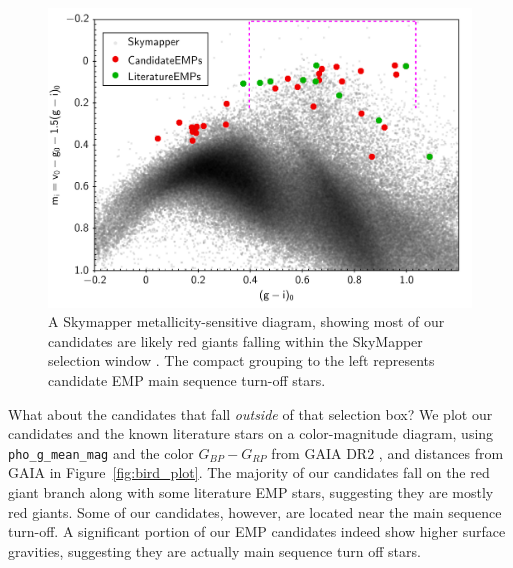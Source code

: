 \documentclass[]{aastex631}
\newcommand{\emps}{EMP stars\xspace}
\begin{document}
\begin{figure}
\includegraphics[width=\linewidth]{Plots/Figure11.pdf}
\caption{A Skymapper metallicity-sensitive diagram, showing most of our candidates are likely red giants falling within the SkyMapper selection window \citep[dashed magenta lines, from][]{Da_Costa_2019}. The compact grouping to the left represents candidate EMP main sequence turn-off stars.}
\label{fig:sky_mapper}
\end{figure}


What about the candidates that fall {\em outside} of that selection box? We plot our candidates and the known literature stars on a color-magnitude diagram, using {\tt pho\_g\_mean\_mag} and the color {$G_{BP} - G_{RP}$} from GAIA DR2 \citep{gaia_dr2}, and distances from GAIA \citep{2018AJ....156...58B} in Figure~\ref{fig:bird_plot}. The majority of our candidates fall on the red giant branch along with some literature \emps, suggesting they are mostly red giants. Some of our candidates, however, are located near the main sequence turn-off. A significant portion of our EMP candidates indeed show higher surface gravities, suggesting they are actually main sequence turn off stars.
\end{document}
